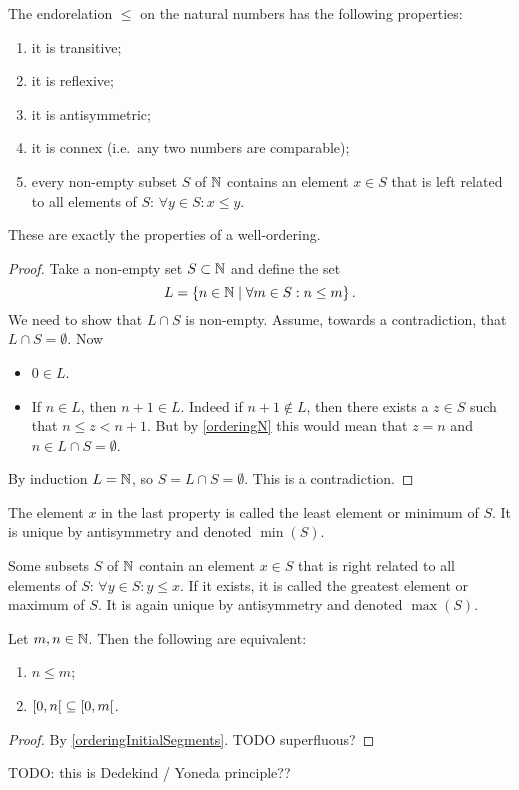\begin{proposition} \label{proposition:wellOrderingN}
The endorelation $\leq$ on the natural numbers has the following properties:
\begin{enumerate}
\item it is transitive;
\item it is reflexive;
\item it is antisymmetric;
\item it is connex (i.e.\ any two numbers are comparable);
\item every non-empty subset $S$ of $\mathbb{N}$ contains an element $x\in S$ that is left related to all elements of $S$: $\forall y\in S: x\leq y$.
\end{enumerate}
These are exactly the properties of a well-ordering.
\end{proposition}
\begin{proof}
Take a non-empty set $S\subset \mathbb{N}$ and define the set
\[ L = \left\{ n\in\mathbb{N} \;\middle|\; \forall m\in S: n\leq m \right\}. \]
We need to show that $L\cap S$ is non-empty. Assume, towards a contradiction, that $L\cap S = \emptyset$.
Now
\begin{itemize}
\item $0\in L$.
\item If $n\in L$, then $n+1\in L$. Indeed if $n+1 \notin L$, then there exists a $z\in S$ such that $n\leq z<n+1$. But by \ref{orderingN} this would mean that $z=n$ and $n\in L\cap S = \emptyset$.
\end{itemize}
By induction $L=\mathbb{N}$, so $S = L\cap S = \emptyset$. This is a contradiction.
\end{proof}


The element $x$ in the last property is called the least element or minimum of $S$. It is unique by antisymmetry and denoted $\min(S)$.

Some subsets $S$ of $\mathbb{N}$ contain an element $x\in S$ that is right related to all elements of $S$: $\forall y\in S: y\leq x$. If it exists, it is called the greatest element or maximum of $S$. It is again unique by antisymmetry and denoted $\max(S)$.

\begin{lemma} \label{naturalNumbersInequalityInclusion}
Let $m,n\in \mathbb{N}$. Then the following are equivalent:
\begin{enumerate}
\item $n\leq m$; 
\item $\interval[co]{0,n} \subseteq \interval[co]{0,m}$.
\end{enumerate}
\end{lemma}
\begin{proof}
By \ref{orderingInitialSegments}. TODO superfluous?
\end{proof}
TODO: this is Dedekind / Yoneda principle??

